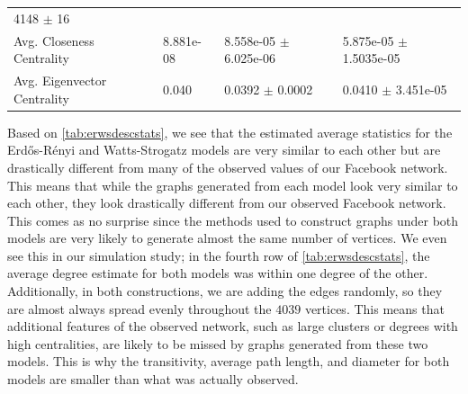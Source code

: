 \documentclass[12pt,twoside]{amherstthesis}
\begin{document}
\begin{longtable}[]{@{}llll@{}}
\begin{minipage}[t]{0.26\columnwidth}
  4148 \(\pm\) 16\strut
  \end{minipage}\tabularnewline
  \begin{minipage}[t]{0.28\columnwidth}\raggedright\strut
  Avg. Closeness Centrality\strut
  \end{minipage} & \begin{minipage}[t]{0.11\columnwidth}\raggedright\strut
  8.881e-08\strut
  \end{minipage} & \begin{minipage}[t]{0.24\columnwidth}\raggedright\strut
  8.558e-05 \(\pm\) 6.025e-06\strut
  \end{minipage} & \begin{minipage}[t]{0.26\columnwidth}\raggedright\strut
  5.875e-05 \(\pm\) 1.5035e-05\strut
  \end{minipage}\tabularnewline
  \begin{minipage}[t]{0.28\columnwidth}\raggedright\strut
  Avg. Eigenvector Centrality\strut
  \end{minipage} & \begin{minipage}[t]{0.11\columnwidth}\raggedright\strut
  0.040\strut
  \end{minipage} & \begin{minipage}[t]{0.24\columnwidth}\raggedright\strut
  0.0392 \(\pm\) 0.0002\strut
  \end{minipage} & \begin{minipage}[t]{0.26\columnwidth}\raggedright\strut
  0.0410 \(\pm\) 3.451e-05\strut
  \end{minipage}\tabularnewline
  \bottomrule
  \end{longtable}
  
  Based on \autoref{tab:erwsdescstats}, we see that the estimated average
  statistics for the Erdős-Rényi and Watts-Strogatz models are very
  similar to each other but are drastically different from many of the
  observed values of our Facebook network. This means that while the
  graphs generated from each model look very similar to each other, they
  look drastically different from our observed Facebook network. This
  comes as no surprise since the methods used to construct graphs under
  both models are very likely to generate almost the same number of
  vertices. We even see this in our simulation study; in the fourth row of
  \autoref{tab:erwsdescstats}, the average degree estimate for both models
  was within one degree of the other. Additionally, in both constructions,
  we are adding the edges randomly, so they are almost always spread
  evenly throughout the \(4039\) vertices. This means that additional
  features of the observed network, such as large clusters or degrees with
  high centralities, are likely to be missed by graphs generated from
  these two models. This is why the transitivity, average path length, and
  diameter for both models are smaller than what was actually observed.
  
\end{document}

